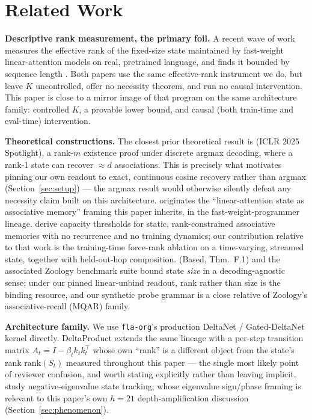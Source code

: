 \section{Related Work}
\label{sec:related-work}


\textbf{Descriptive rank measurement, the primary foil.} A recent wave of
work measures the effective rank of the fixed-size state maintained by
fast-weight linear-attention models on real, pretrained language, and
finds it bounded by sequence length \citep{nazari2026rank,
sun2026staterank}. Both papers use the same effective-rank instrument we
do, but leave $K$ uncontrolled, offer no necessity theorem, and run no
causal intervention. This paper is close to a mirror image of that
program on the same architecture family: controlled $K$, a provable lower
bound, and causal (both train-time and eval-time) intervention.

\textbf{Theoretical constructions.} The closest prior theoretical result
is \citet{nichani2025factual} (ICLR 2025 Spotlight), a rank-$m$ existence
proof under discrete argmax decoding, where a rank-1 state can recover
$\approx d$ associations. This is precisely what motivates pinning our
own readout to exact, continuous cosine recovery rather than argmax
(Section~\ref{sec:setup}) --- the argmax result would otherwise silently
defeat any necessity claim built on this architecture.
\citet{schlag2021linear} originates the ``linear-attention state as
associative memory'' framing this paper inherits, in the fast-weight-programmer
lineage. \citet{barnfield2026sharp} derive capacity thresholds for static,
rank-constrained associative memories with no recurrence and no training
dynamics; our contribution relative to that work is the training-time
force-rank ablation on a time-varying, streamed state, together with
held-out-hop composition. \citet{arora2024simple} (Based, Thm.\ F.1) and
the associated Zoology benchmark suite \citep{arora2023zoology} bound
state \emph{size} in a decoding-agnostic sense; under our pinned
linear-unbind readout, rank rather than size is the binding resource, and
our synthetic probe grammar is a close relative of Zoology's
associative-recall (MQAR) family.

\textbf{Architecture family.} We use \texttt{fla-org}'s production
DeltaNet / Gated-DeltaNet kernel directly. DeltaProduct
\citep{siems2025deltaproduct} extends the same lineage with a
per-step transition matrix $A_t = I - \beta_t k_t k_t^\top$ whose own
``rank'' is a different object from the state's rank $\mathrm{rank}(S_t)$
measured throughout this paper --- the single most likely point of
reviewer confusion, and worth stating explicitly rather than leaving
implicit. \citet{grazzi2025negative} study negative-eigenvalue state
tracking, whose eigenvalue sign/phase framing is relevant to this paper's
own $h{=}21$ depth-amplification discussion (Section~\ref{sec:phenomenon}).


